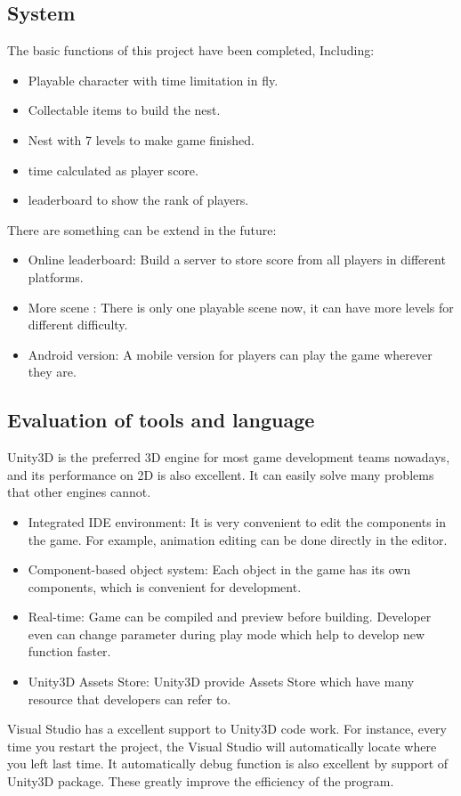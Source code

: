 \documentclass[12pt]{article}
\begin{document}
\subsection{System}
The basic functions of this project have been completed, Including:
\begin{itemize}
\item Playable character with time limitation in fly.
\item Collectable items to build the nest.
\item Nest with 7 levels to make game finished.
\item time calculated as player score.
\item leaderboard to show the rank of players.
\end{itemize}
There are something can be extend in the future:
\begin{itemize}
\item Online leaderboard: Build a server to store score from all players in different platforms.
\item More scene : There is only one playable scene now, it can have more levels for different difficulty. 
\item Android version: A mobile version for players can play the game wherever they are.
\end{itemize}

\subsection{Evaluation of tools and language}
Unity3D is the preferred 3D engine for most game development teams nowadays, and its performance on 2D is also excellent. It can easily solve many problems that other engines cannot.
\begin{itemize}
\item Integrated IDE environment: It is very convenient to edit the components in the game. For example, animation editing can be done directly in the editor.
\item Component-based object system: Each object in the game has its own components, which is convenient for development.
\item Real-time: Game can be compiled and preview before building. Developer even can change parameter during play mode which help to develop new function faster.
\item Unity3D Assets Store: Unity3D provide Assets Store which have many resource that developers can refer to.
\end{itemize}
Visual Studio has a excellent support to Unity3D code work. For instance, every time you restart the project, the Visual Studio will automatically locate where you left last time. It automatically debug function is also excellent by support of Unity3D package. These greatly improve the efficiency of the program.
\end{document}
